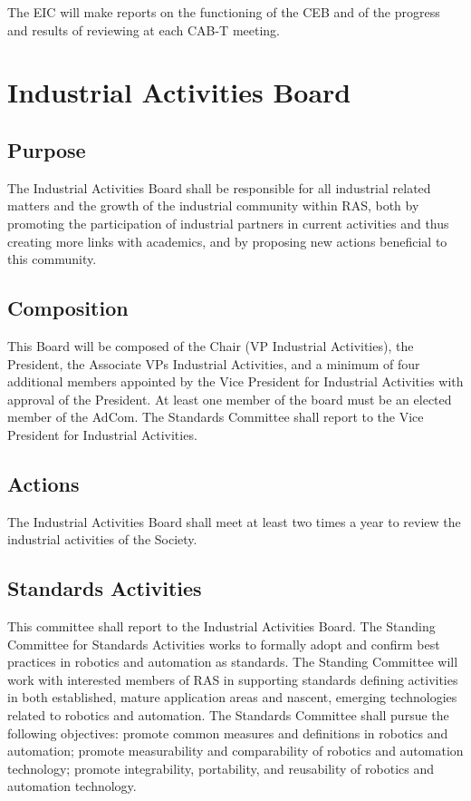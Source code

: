 \documentclass[10pt]{article}
\begin{document}
The EIC will make reports on the functioning of the CEB and of the progress and results of reviewing at each CAB-T meeting.


\section{Industrial Activities Board}
\label{IAB}
\subsection{Purpose}

The Industrial Activities Board shall be responsible for all industrial related matters and the growth of the industrial community within RAS, both by promoting the participation of industrial partners in current activities and thus creating more links with academics, and by proposing new actions beneficial to this community.

\subsection{Composition}
This Board will be composed of the Chair (VP Industrial Activities), the President, the Associate VPs Industrial Activities, and a minimum of four additional members appointed by the Vice President for Industrial Activities with approval of the President. At least one member of the board must be an elected member of the AdCom. The Standards Committee shall report to the Vice President for Industrial Activities.

\subsection{Actions}
The Industrial Activities Board shall meet at least two times a year to review the industrial activities of the Society.

\subsection{Standards Activities}
This committee shall report to the Industrial Activities Board. The Standing Committee for Standards Activities works to formally adopt and confirm best practices in robotics and automation as standards. The Standing Committee will work with interested members of RAS in supporting standards defining activities in both established, mature application areas and nascent, emerging technologies related to robotics and automation. The Standards Committee shall pursue the following objectives: promote common measures and definitions in robotics and automation; promote measurability and comparability of robotics and automation technology; promote integrability, portability, and reusability of robotics and automation technology.
\end{document}
